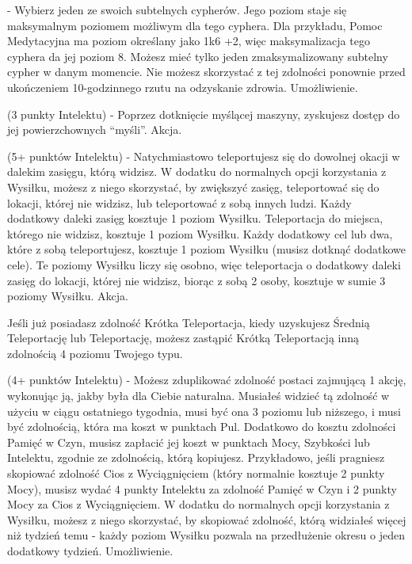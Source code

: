  - Wybierz jeden ze swoich subtelnych cypherów. Jego poziom staje się maksymalnym poziomem możliwym dla tego cyphera. Dla przykładu, Pomoc Medytacyjna ma poziom określany jako 1k6 +2, więc maksymalizacja tego cyphera da jej poziom 8. Możesz mieć tylko jeden zmaksymalizowany subtelny cypher w danym momencie. Nie możesz skorzystać z tej zdolności ponownie przed ukończeniem 10-godzinnego rzutu na odzyskanie zdrowia. Umożliwienie. 

 (3 punkty Intelektu) - Poprzez dotknięcie myślącej maszyny, zyskujesz dostęp do jej powierzchownych ``myśli''. Akcja.

 (5+ punktów Intelektu) - Natychmiastowo teleportujesz się do dowolnej okacji w dalekim zasięgu, którą widzisz. W dodatku do normalnych opcji korzystania z Wysiłku, możesz z niego skorzystać, by zwiększyć zasięg, teleportować się do lokacji, której nie widzisz, lub teleportować z sobą innych ludzi. Każdy dodatkowy daleki zasięg kosztuje 1 poziom Wysiłku. Teleportacja do miejsca, którego nie widzisz, kosztuje 1 poziom Wysiłku. Każdy dodatkowy cel lub dwa, które z sobą teleportujesz, kosztuje 1 poziom Wysiłku (musisz dotknąć dodatkowe cele). Te poziomy Wysiłku liczy się osobno, więc teleportacja o dodatkowy daleki zasięg do lokacji, której nie widzisz, biorąc z sobą 2 osoby, kosztuje w sumie 3 poziomy Wysiłku. Akcja.

Jeśli już posiadasz zdolność Krótka Teleportacja, kiedy uzyskujesz Średnią Teleportację lub Teleportację, możesz zastąpić Krótką Teleportacją inną zdolnością 4 poziomu Twojego typu.

 (4+ punktów Intelektu) - Możesz zduplikować zdolność postaci zajmującą 1 akcję, wykonując ją, jakby była dla Ciebie naturalna. Musiałeś widzieć tą zdolność w użyciu w ciągu ostatniego tygodnia, musi być ona 3 poziomu lub niższego, i musi być zdolnością, która ma koszt w punktach Pul. Dodatkowo do kosztu zdolności Pamięć w Czyn, musisz zapłacić jej koszt w punktach Mocy, Szybkości lub Intelektu, zgodnie ze zdolnością, którą kopiujesz. Przykładowo, jeśli pragniesz skopiować zdolność Cios z Wyciągnięciem (który normalnie kosztuje 2 punkty Mocy), musisz wydać 4 punkty Intelektu za zdolność Pamięć w Czyn i 2 punkty Mocy za Cios z Wyciągnięciem. W dodatku do normalnych opcji korzystania z Wysiłku, możesz z niego skorzystać, by skopiować zdolność, którą widziałeś więcej niż tydzień temu - każdy poziom Wysiłku pozwala na przedłużenie okresu o jeden dodatkowy tydzień. Umożliwienie.

